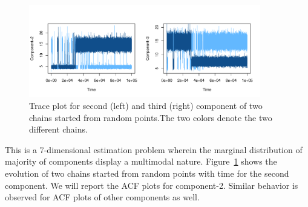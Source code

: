\documentclass[11pt]{article}
\theoremstyle{remark}
\begin{document}

\begin{figure}[h]
    \centering
    \includegraphics[width = 0.9\textwidth]{plots/poisson-trace_n1e+05.pdf}
    \caption{Trace plot for second (left) and third (right) component of two chains started from random points.The two colors denote the two different chains.}
    \label{fig:poisson-trace}
\end{figure}

This is a 7-dimensional estimation problem wherein the marginal distribution of majority of components display a multimodal nature. Figure~\ref{fig:poisson-trace} shows the evolution of two chains started from random points with time for the second component. We will report the ACF plots for component-2. Similar behavior is observed for ACF plots of other components as well.\\
\end{document}
